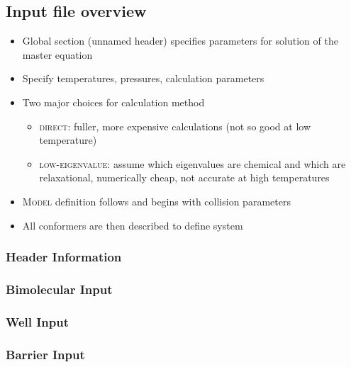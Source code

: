\documentclass[a4paper,10pt]{article}
\begin{document}
\subsection{Input file overview}
  \begin{itemize}
   \item Global section (unnamed header) specifies parameters for solution of the master equation
   \item Specify temperatures, pressures, calculation parameters
   \item Two major choices for calculation method
    \begin{itemize}
     \item \textsc{direct}: fuller, more expensive calculations (not so good at low temperature)
     \item \textsc{low-eigenvalue}: assume which eigenvalues are chemical and which are relaxational, numerically cheap, not accurate at high temperatures
    \end{itemize}
   \item \textsc{Model} definition follows and begins with collision parameters
   \item All conformers are then described to define system
  \end{itemize}


\subsubsection[fragile]{Header Information}
  


\subsubsection[fragile]{Bimolecular Input}
  


\subsubsection[fragile]{Well Input}
  


\subsubsection[fragile]{Barrier Input}
  
\end{document}
